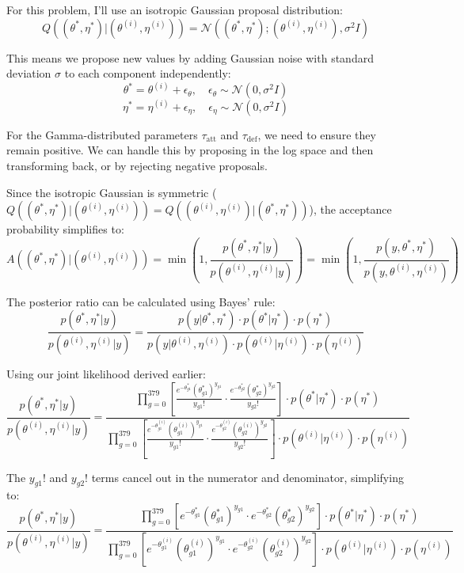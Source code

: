 \documentclass{article}
\begin{document}
\begin{enumerate}
For this problem, I'll use an isotropic Gaussian proposal distribution:
\[
Q((\theta^*, \eta^*) | (\theta^{(i)}, \eta^{(i)})) = \mathcal{N}((\theta^*, \eta^*); (\theta^{(i)}, \eta^{(i)}), \sigma^2 I)
\]

This means we propose new values by adding Gaussian noise with standard deviation $\sigma$ to each component independently:
\[
\theta^* = \theta^{(i)} + \epsilon_{\theta}, \quad \epsilon_{\theta} \sim \mathcal{N}(0, \sigma^2 I)
\]
\[
\eta^* = \eta^{(i)} + \epsilon_{\eta}, \quad \epsilon_{\eta} \sim \mathcal{N}(0, \sigma^2 I)
\]

For the Gamma-distributed parameters $\tau_{\text{att}}$ and $\tau_{\text{def}}$, we need to ensure they remain positive. We can handle this by proposing in the log space and then transforming back, or by rejecting negative proposals.

Since the isotropic Gaussian is symmetric ($Q((\theta^*, \eta^*) | (\theta^{(i)}, \eta^{(i)})) = Q((\theta^{(i)}, \eta^{(i)}) | (\theta^*, \eta^*))$), the acceptance probability simplifies to:
\[
A((\theta^*, \eta^*) | (\theta^{(i)}, \eta^{(i)})) = \min\left(1, \frac{p(\theta^*, \eta^* | y)}{p(\theta^{(i)}, \eta^{(i)} | y)}\right) = \min\left(1, \frac{p(y, \theta^*, \eta^*)}{p(y, \theta^{(i)}, \eta^{(i)})}\right)
\]

The posterior ratio can be calculated using Bayes' rule:
\[
\frac{p(\theta^*, \eta^* | y)}{p(\theta^{(i)}, \eta^{(i)} | y)} = \frac{p(y | \theta^*, \eta^*) \cdot p(\theta^* | \eta^*) \cdot p(\eta^*)}{p(y | \theta^{(i)}, \eta^{(i)}) \cdot p(\theta^{(i)} | \eta^{(i)}) \cdot p(\eta^{(i)})}
\]

Using our joint likelihood derived earlier:
\[
\frac{p(\theta^*, \eta^* | y)}{p(\theta^{(i)}, \eta^{(i)} | y)} = \frac{
\prod_{g=0}^{379} \left[\frac{e^{-\theta^*_{g1}}(\theta^*_{g1})^{y_{g1}}}{y_{g1}!} \cdot \frac{e^{-\theta^*_{g2}}(\theta^*_{g2})^{y_{g2}}}{y_{g2}!}\right] \cdot p(\theta^* | \eta^*) \cdot p(\eta^*)}
{\prod_{g=0}^{379} \left[\frac{e^{-\theta^{(i)}_{g1}}(\theta^{(i)}_{g1})^{y_{g1}}}{y_{g1}!} \cdot \frac{e^{-\theta^{(i)}_{g2}}(\theta^{(i)}_{g2})^{y_{g2}}}{y_{g2}!}\right] \cdot p(\theta^{(i)} | \eta^{(i)}) \cdot p(\eta^{(i)})}
\]

The $y_{g1}!$ and $y_{g2}!$ terms cancel out in the numerator and denominator, simplifying to:
\[
\frac{p(\theta^*, \eta^* | y)}{p(\theta^{(i)}, \eta^{(i)} | y)} = \frac{
\prod_{g=0}^{379} \left[e^{-\theta^*_{g1}}(\theta^*_{g1})^{y_{g1}} \cdot e^{-\theta^*_{g2}}(\theta^*_{g2})^{y_{g2}}\right] \cdot p(\theta^* | \eta^*) \cdot p(\eta^*)}
{\prod_{g=0}^{379} \left[e^{-\theta^{(i)}_{g1}}(\theta^{(i)}_{g1})^{y_{g1}} \cdot e^{-\theta^{(i)}_{g2}}(\theta^{(i)}_{g2})^{y_{g2}}\right] \cdot p(\theta^{(i)} | \eta^{(i)}) \cdot p(\eta^{(i)})}
\]


\end{enumerate}
\end{document}
